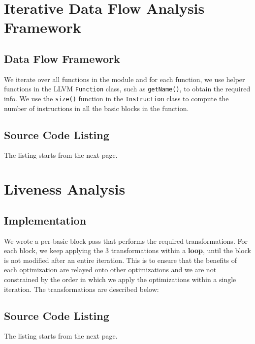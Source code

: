 \section{Iterative Data Flow Analysis Framework}

\subsection{Data Flow Framework}

We iterate over all functions in the module and for each function, we use helper functions in the
LLVM \texttt{Function} class, such as \texttt{getName()}, to obtain the required info.
We use the \texttt{size()} function in the \texttt{Instruction} class to compute the number of
instructions in all the basic blocks in the function.

\subsection{Source Code Listing}

The listing starts from the next page.



\section{Liveness Analysis}

\subsection{Implementation}

We wrote a per-basic block pass that performs the required transformations. For each block, we keep
applying the 3 transformations within a \textbf{loop}, until the block is not modified after an entire iteration.
This is to ensure that the benefits of each optimization are relayed onto other optimizations and we
are not constrained by the order in which we apply the optimizations within a single iteration.
The transformations are described below:

\subsection{Source Code Listing}

The listing starts from the next page.



